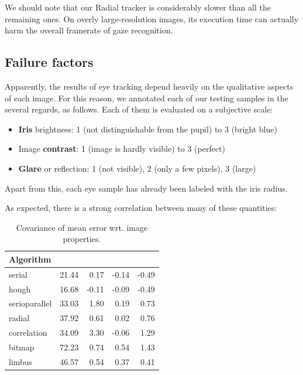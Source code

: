We should note that our Radial tracker is considerably slower than all the remaining ones.
On overly large-resolution images, its execution time can actually harm the overall framerate of gaze recognition.

\subsection{Failure factors}
\label{s:results-eyecovar}

Apparently, the results of eye tracking depend heavily on the qualitative aspects of each image.
For this reason, we annotated each of our testing samples in the several regards, as follows.
Each of them is evaluated on a subjective scale:
\begin{itemize}
\item \textbf{Iris} brightness:
1 (not distinguishable from the pupil) to 3 (bright blue)
\item Image \textbf{contrast}:
1 (image is hardly visible) to 3 (perfect)
\item \textbf{Glare} or reflection:
1 (not visible), 2 (only a few pixels), 3 (large)
\end{itemize}
Apart from this, each eye sample has already been labeled with the iris radius.

As expected, there is a strong correlation between many of these quantities:
\begin{table}[h!]
\centering
\begin{tabular}{l@{\hspace{1.5cm}}D{.}{.}{3.2}D{.}{.}{3.2}D{.}{.}{3.2}D{.}{.}{3.2}}
\toprule
\textbf{Algorithm} &  &  &  & \\
\midrule
serial & 21.44 & 0.17 & -0.14 & -0.49\\
hough & 16.68 & -0.11 & -0.09 & -0.49\\
serioparallel & 33.03 & 1.80 & 0.19 & 0.73\\
radial & 37.92 & 0.61 & 0.02 & 0.76\\
correlation & 34.09 & 3.30 & -0.06 & 1.29\\
bitmap & 72.23 & 0.74 & 0.54 & 1.43\\
limbus & 46.57 & 0.54 & 0.37 & 0.41\\
\bottomrule
\end{tabular}
\caption{Covariance of mean error wrt. image properties.}\label{t:algo-covar}
\end{table}

